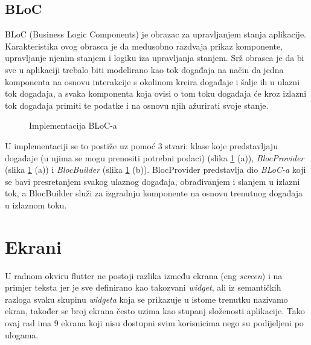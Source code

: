 \documentclass[times, utf8, zavrsni]{fer}
\begin{document}
\subsection{BLoC}
BLoC (Business Logic Components) je obrazac za upravljanjem stanja aplikacije. Karakteristika ovog obrasca
je da međusobno razdvaja prikaz komponente, upravljanje njenim stanjem i logiku iza upravljanja stanjem.
Srž obrasca je da bi sve u aplikaciji trebalo biti modelirano kao tok događaja na način da jedna komponenta
na osnovu interakcije s okolinom kreira događaje i šalje ih u ulazni tok događaja, a svaka komponenta koja
ovisi o tom toku događaja će kroz izlazni tok događaja primiti te podatke i na osnovu njih ažurirati svoje stanje.
\begin{figure}[h]
      \centering
      \caption{Implementacija BLoC-a}
      \label{fig:BLoC}
\end{figure}
U implementaciji se to postiže uz pomoć 3 stvari: klase koje predstavljaju događaje (u njima se mogu prenositi
potrebni podaci) (slika \ref{fig:BLoC} (a)), \textit{BlocProvider} (slika \ref{fig:BLoC} (a))
i \textit{BlocBuilder} (slika \ref{fig:BLoC} (b)). BlocProvider predstavlja dio \textit{BLoC-a}
koji se bavi presretanjem svakog ulaznog događaja, obrađivanjem i slanjem u izlazni tok, a BlocBuilder
služi za izgradnju komponente na osnovu trenutnog događaja u izlaznom toku.

\section{Ekrani}
U radnom okviru flutter ne postoji razlika između ekrana (eng \textit{screen}) i na primjer teksta jer je sve definirano
kao takozvani \textit{widget}, ali iz semantičkih razloga svaku skupinu \textit{widgeta} koja
se prikazuje u istome trenutku nazivamo ekran, također se broj ekrana često uzima kao stupanj
složenosti aplikacije. Tako ovaj rad ima 9 ekrana koji nisu dostupni svim korisnicima nego
su podijeljeni po ulogama.
\end{document}
